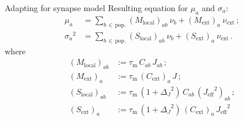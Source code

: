 \documentclass[xcolor=x11names,compress]{beamer}
\renewcommand{\(}{\begin{columns}}
\renewcommand{\)}{\end{columns}}
\newcommand{\<}[1]{\begin{column}{#1}}
\renewcommand{\>}{\end{column}}
\begin{document}
\begin{frame}[t]{Adapting for synapse model}
Resulting equation for $\mu_a$ and $\sigma_a$:
\begin{align*}
    \mu_a        &= 
        \sum_{b \,\in \,\text{pop.}}  (M_\text{local})_{ab} \: \nu_b 
        + (M_\text{ext})_{a} \: \nu_\text{ext} \, ; \\
    {\sigma_a}^2 &= 
        \sum_{b \,\in \,\text{pop.}} (S_\text{local})_{ab} \: \nu_b
        + (S_\text{ext})_{a}  \:\nu_\text{ext}\,.
\end{align*}
where
\begin{align*}
    (M_\text{local})_{ab} 
        &:= \tau_\text{m} \, C_{ab} \,J_{ab} \,;\\ 
    (M_\text{ext})_{a} 
        &:= \tau_\text{m} \, (C_\text{ext})_a \,J \,;\\
    (S_\text{local})_{ab} 
        &:= \tau_\text{m} \,(1 + {\Delta_J}^2) \,C_{ab} \,({J_\text{eff}}^2)_{ab} \,;\\
    (S_\text{ext})_{a} 
        &:= \tau_\text{m} \,(1 + {\Delta_J}^2) \,(C_\text{ext})_a \,{J_\text{eff}}^2 
\end{align*}
\end{frame}

    
\end{document}
